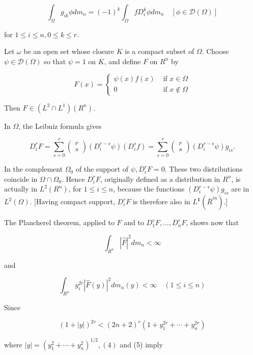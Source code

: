 \documentclass[10pt]{article}
\begin{document}
$$
\int_{\Omega} g_{i k} \phi d m_{n}=(-1)^{k} \int_{\Omega} f D_{i}^{k} \phi d m_{n} \quad[\phi \in \mathscr{D}(\Omega)]
$$

for $1 \leq i \leq n, 0 \leq k \leq r$.

Let $\omega$ be an open set whose closure $K$ is a compact subset of $\Omega$. Choose $\psi \in \mathscr{D}(\Omega)$ so that $\psi=1$ on $K$, and define $F$ on $R^{n}$ by

$$
F(x)= \begin{cases}\psi(x) f(x) & \text { if } x \in \Omega \\ 0 & \text { if } x \notin \Omega\end{cases}
$$

Then $F \in\left(L^{2} \cap L^{1}\right)\left(R^{n}\right)$.

In $\Omega$, the Leibniz formula gives

$$
D_{i}^{r} F=\sum_{s=0}^{r}\left(\begin{array}{l}
r \\
s
\end{array}\right)\left(D_{i}^{r-s} \psi\right)\left(D_{i}^{s} f\right)=\sum_{s=0}^{r}\left(\begin{array}{l}
r \\
s
\end{array}\right)\left(D_{i}^{r-s} \psi\right) g_{i s} .
$$

In the complement $\Omega_{0}$ of the support of $\psi, D_{i}^{r} F=0$. These two distributions coincide in $\Omega \cap \Omega_{0}$. Hence $D_{i}^{r} F$, originally defined as a distribution in $R^{n}$, is actually in $L^{2}\left(R^{n}\right)$, for $1 \leq i \leq n$, because the functions $\left(D_{i}^{r-s} \psi\right) g_{i s}$ are in $L^{2}(\Omega)$. [Having compact support, $D_{i}^{r} F$ is therefore also in $L^{\mathbf{1}}\left(\bar{R}^{i n}\right)$.]

The Plancherel theorem, applied to $F$ and to $D_{1}^{r} F, \ldots, D_{n}^{r} F$, shows now that

$$
\int_{R^{n}}|\hat{F}|^{2} d m_{n}<\infty
$$

and

$$
\int_{R^{n}} y_{i}^{2 r}|\hat{F}(y)|^{2} d m_{n}(y)<\infty \quad(1 \leq i \leq n)
$$

Since

$$
(1+|y|)^{2 r}<(2 n+2)^{r}\left(1+y_{1}^{2 r}+\cdots+y_{n}^{2 r}\right)
$$

where $|y|=\left(y_{1}^{2}+\cdots+y_{n}^{2}\right)^{1 / 2},(4)$ and (5) imply
\end{document}
